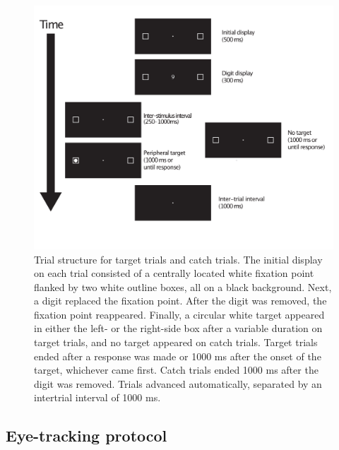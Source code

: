 \documentclass[man,floatsintext]{apa6}
\theoremstyle{definition}
\theoremstyle{definition}
\theoremstyle{definition}
\theoremstyle{remark}
\begin{document}
\begin{figure}
\includegraphics[width=\textwidth]{trialstructure} \caption{Trial structure for target trials and catch trials. The
initial display on each trial consisted of a centrally located white
fixation point flanked by two white outline boxes, all on a black
background. Next, a digit replaced the fixation point. After the digit
was removed, the fixation point reappeared. Finally, a circular white
target appeared in either the left- or the right-side box after a
variable duration on target trials, and no target appeared on catch
trials. Target trials ended after a response was made or 1000 ms after
the onset of the target, whichever came first. Catch trials ended 1000
ms after the digit was removed. Trials advanced automatically, separated
by an intertrial interval of 1000 ms.}\label{fig:Trial}
\end{figure}

\subsection{Eye-tracking protocol}\label{eye-tracking-protocol}
\end{document}
